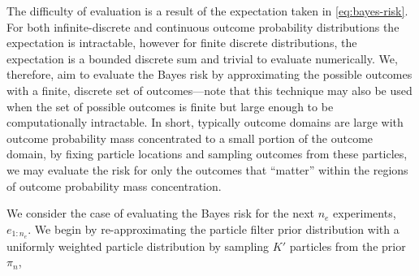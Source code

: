 \documentclass[aps,nofootinbib,twocolumn,superscriptaddress]{revtex4}
\newcommand{\eps}{e}
\begin{document}
The difficulty of evaluation is a result of the expectation taken in \autoref{eq:bayes-risk}. For both infinite-discrete and continuous outcome probability distributions the expectation is intractable, however for finite discrete distributions, the expectation is a bounded discrete sum and trivial to evaluate numerically. We, therefore, aim to evaluate the Bayes risk by approximating the possible outcomes with a finite, discrete set of outcomes---note that this technique may also be used when the set of possible outcomes is finite but large enough to be computationally intractable. In short, typically outcome domains are large with outcome probability mass concentrated to a small portion of the outcome domain, by fixing particle locations and sampling outcomes from these particles, we may evaluate the risk for only the outcomes that ``matter'' within the regions of outcome probability mass concentration. 

We consider the case of evaluating the Bayes risk for the next $n_e$ experiments, $\eps_{1:n_e}$. We begin by re-approximating the particle filter prior distribution with a uniformly weighted particle distribution by sampling $K'$ particles from the prior $\pi_{n}$,
\end{document}
